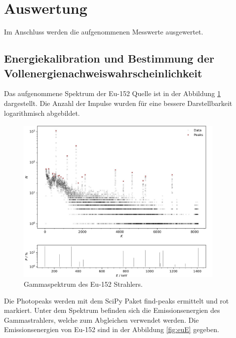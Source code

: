\section{Auswertung}
\label{sec:auswertung}

Im Anschluss werden die aufgenommenen Messwerte ausgewertet.

\subsection{Energiekalibration und Bestimmung der Vollenergienachweiswahrscheinlichkeit}
\label{sec:auswertung1}

Das aufgenommene Spektrum der Eu-152 Quelle ist in der Abbildung \ref{fig:plot1}
dargestellt. Die Anzahl der Impulse wurden für eine bessere Darstellbarkeit logarithmisch abgebildet. 

\begin{figure}[H]
    \centering
    \includegraphics[width=0.9\textwidth]{content/plots/plot1.jpg}
   \caption{Gammaspektrum des Eu-152 Strahlers.}
    \label{fig:plot1}
\end{figure}

Die Photopeaks werden mit dem SciPy Paket find-peaks ermittelt und rot markiert.
Unter dem Spektrum befinden sich die Emissionsenergien des Gammastrahlers, welche zum Abgleichen verwendet werden.
Die Emissionsenergien von Eu-152 sind in der Abbildung \ref{fig:euE} gegeben.

